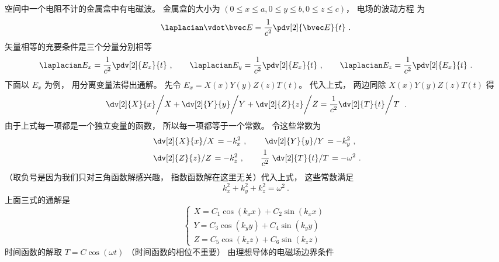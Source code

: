 

空间中一个电阻不计的金属盒中有电磁波。 金属盒的大小为 $(0 \leqslant x \leqslant a, 0 \leqslant y \leqslant b, 0 \leqslant z \leqslant c)$， 电场的波动方程%
为
\begin{equation}
\laplacian \vdot \bvec E = \frac{1}{c^2} \pdv[2]{\bvec E}{t}~.
\end{equation}  
矢量相等的充要条件是三个分量分别相等
\begin{equation}
\laplacian E_x = \frac{1}{c^2} \pdv[2]{E_x}{t} ~,\qquad
\laplacian E_y = \frac{1}{c^2} \pdv[2]{E_x}{t} ~,\qquad
\laplacian E_z = \frac{1}{c^2} \pdv[2]{E_x}{t}~.
\end{equation}   
下面以 $E_x$ 为例， 用分离变量法得出通解。
先令 $E_x = X(x) Y(y) Z(z) T(t)$。 代入上式， 两边同除 $X(x) Y(y) Z(z) T(t)$ 得
\begin{equation}
\left. \dv[2]{X}{x} \middle/ X + \dv[2]{Y}{y} \middle/ Y + \dv[2]{Z}{z} \middle/ Z  = \frac{1}{c^2}  \dv[2]{T}{t} \middle/ T\right.~.
\end{equation}
由于上式每一项都是一个独立变量的函数， 所以每一项都等于一个常数。 令这些常数为
\begin{equation}\begin{aligned}
&\left. \dv[2]{X}{x} \middle/ X \right. = -k_x^2 ~,\qquad
\left. \dv[2]{Y}{y} \middle/ Y \right. = -k_y^2~,\\
&\left. \dv[2]{Z}{z} \middle/ Z \right. = -k_z^2 ~,\qquad
\frac{1}{c^2} \left. \dv[2]{T}{t} \middle/ T \right. = -\omega^2~.
\end{aligned}\end{equation}
（取负号是因为我们只对三角函数解感兴趣， 指数函数解在这里无关）代入上式， 这些常数满足
\begin{equation}
k_x^2 + k_y^2 + k_z^2 = \omega ^2~.
\end{equation} 
上面三式的通解是
\begin{equation}
\begin{cases}
X = C_1\cos(k_x x) + C_2\sin(k_x x)\\
Y = C_3\cos(k_y y) + C_4\sin(k_y y)\\
Z = C_5\cos(k_z z) + C_6\sin(k_z z)
\end{cases}~
\end{equation} 
时间函数的解取 $T = C\cos(\omega t)$ （时间函数的相位不重要）
由理想导体的电磁场边界条件%
